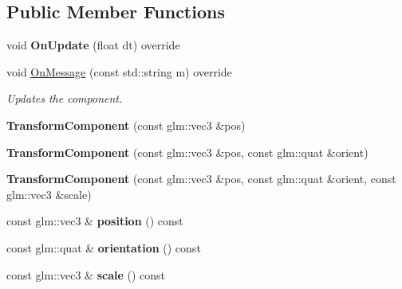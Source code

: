 \subsection*{Public Member Functions}
\begin{DoxyCompactItemize}
\item 
\mbox{\label{class_transform_component_ab763f5af77fcb5eee0e725c219901fa3}} 
void {\bfseries On\+Update} (float dt) override
\item 
\mbox{\label{class_transform_component_ac250c4b7e47e639d0f8693d04c9b5051}} 
void \mbox{\hyperlink{class_transform_component_ac250c4b7e47e639d0f8693d04c9b5051}{On\+Message}} (const std\+::string m) override
\begin{DoxyCompactList}\small\item\em Updates the component. \end{DoxyCompactList}\item 
\mbox{\label{class_transform_component_a01037615eda19c3bbb51c99094839574}} 
{\bfseries Transform\+Component} (const glm\+::vec3 \&pos)
\item 
\mbox{\label{class_transform_component_a05ce9d2b5a350a5d8d67ce6b323818d4}} 
{\bfseries Transform\+Component} (const glm\+::vec3 \&pos, const glm\+::quat \&orient)
\item 
\mbox{\label{class_transform_component_aa823162adc73870484409dcdb8cc95f3}} 
{\bfseries Transform\+Component} (const glm\+::vec3 \&pos, const glm\+::quat \&orient, const glm\+::vec3 \&scale)
\item 
\mbox{\label{class_transform_component_a1f236ca0fb57ccb2a5e1238502a880ac}} 
const glm\+::vec3 \& {\bfseries position} () const
\item 
\mbox{\label{class_transform_component_a7655d65aee0cb5dc459e8f632c80a6d1}} 
const glm\+::quat \& {\bfseries orientation} () const
\item 
\mbox{\label{class_transform_component_a4b04c6a025c6be6bd0b9400827ee2291}} 
const glm\+::vec3 \& {\bfseries scale} () const

\end{DoxyCompactItemize}
